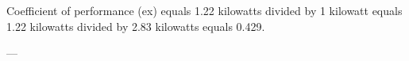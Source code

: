 Coefficient of performance (ex) equals 1.22 kilowatts divided by 1 kilowatt equals 1.22 kilowatts divided by 2.83 kilowatts equals 0.429.  

---